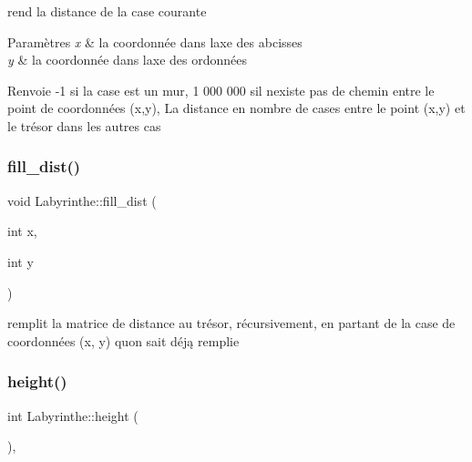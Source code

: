 rend la distance de la case courante 


\begin{DoxyParams}{Paramètres}
{\em x} & la coordonnée dans l\textquotesingle{}axe des abcisses \\
\hline
{\em y} & la coordonnée dans l\textquotesingle{}axe des ordonnées \\
\hline
\end{DoxyParams}
\begin{DoxyReturn}{Renvoie}
-\/1 si la case est un mur, 1 000 000 s\textquotesingle{}il n\textquotesingle{}existe pas de chemin entre le point de coordonnées (x,y), La distance en nombre de cases entre le point (x,y) et le trésor dans les autres cas 
\end{DoxyReturn}
\mbox{\label{classLabyrinthe_ac465d56c311759a7f55a54da90329e17}} 
\subsubsection{\texorpdfstring{fill\+\_\+dist()}{fill\_dist()}}
{\footnotesize\ttfamily void Labyrinthe\+::fill\+\_\+dist (\begin{DoxyParamCaption}\item[{int}]{x,  }\item[{int}]{y }\end{DoxyParamCaption})\hspace{0.3cm}{\ttfamily [private]}}



remplit la matrice de distance au trésor, récursivement, en partant de la case de coordonnées (x, y) qu\textquotesingle{}on sait déją remplie 

\mbox{\label{classLabyrinthe_a71d545c9606ad5e8bf840293f22e552b}} 
\subsubsection{\texorpdfstring{height()}{height()}}
{\footnotesize\ttfamily int Labyrinthe\+::height (\begin{DoxyParamCaption}{ }\end{DoxyParamCaption})\hspace{0.3cm}{\ttfamily [inline]}, {\ttfamily [virtual]}}



